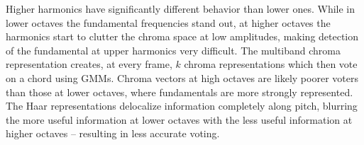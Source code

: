\documentclass{article}
\begin{document}
	Higher harmonics have significantly different behavior than lower ones. While in lower octaves the fundamental frequencies stand out, at higher octaves the harmonics start to clutter the chroma space at low amplitudes, making detection of the fundamental at upper harmonics very difficult. The multiband chroma representation creates, at every frame, $k$ chroma representations which then vote on a chord using GMMs. Chroma vectors at high octaves are likely poorer voters than those at lower octaves, where fundamentals are more strongly represented. The Haar representations delocalize information completely along pitch, blurring the more useful information at lower octaves with the less useful information at higher octaves -- resulting in less accurate voting. 




%
%
%
%
\end{document}

